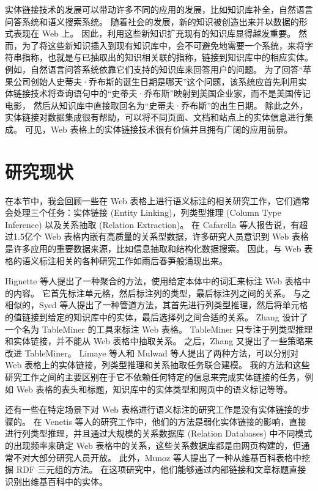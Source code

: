实体链接技术的发展可以带动许多不同的应用的发展，比如知识库补全，自然语言问答系统和语义搜索系统。
随着社会的发展，新的知识被创造出来并以数据的形式表现在 Web 上。
因此，利用这些新知识扩充现有的知识库显得越发重要。
然而，为了将这些新知识插入到现有知识库中，会不可避免地需要一个系统，来将字符串指称，也就是与已抽取出的知识相关联的指称，链接到知识库中的相应实体。
例如，自然语言问答系统依靠它们支持的知识库来回答用户的问题。
为了回答``苹果公司创始人史蒂夫·乔布斯的诞生日期是哪天''这个问题，该系统应首先利用实体链接技术将查询语句中的``史蒂夫·乔布斯''映射到美国企业家，而不是美国传记电影，
然后从知识库中直接取回名为``史蒂夫·乔布斯''的出生日期。
除此之外，实体链接对数据集成很有帮助，可以将不同页面、文档和站点上的实体信息进行集成。
可见，Web 表格上的实体链接技术很有价值并且拥有广阔的应用前景。\par


\section{研究现状}

在本节中，我会回顾一些在 Web 表格上进行语义标注的相关研究工作，它们通常会处理三个任务：实体链接 (Entity Linking)，列类型推理 (Column Type Inference) 以及关系抽取 (Relation Extraction)。 
在 Cafarella 等人\cite{cafarella2008webtables}报告说，有超过1.5亿个 Web 表格内嵌有高质量的关系型数据，许多研究人员意识到 Web 表格是许多应用的重要数据来源，比如信息抽取和结构化数据搜索。 
因此，与 Web 表格的语义标注相关的各种研究工作如雨后春笋般涌现出来。\par

Hignette 等人\cite{hignette2009fuzzy}提出了一种聚合的方法，使用给定本体中的词汇来标注 Web 表格中的内容。
它首先标注单元格，然后标注列的类型，最后标注列之间的关系。
与之相似的，Syed 等人\cite{syed2010exploiting}提出了一种管道方法，其首先进行列类型推理，然后将单元格的值链接到给定的知识库中的实体，最后选择列之间合适的关系。
Zhang \cite{zhang2014towards}设计了一个名为 TableMiner 的工具来标注 Web 表格。
TableMiner 只专注于列类型推理和实体链接，并不能从 Web 表格中抽取关系。
之后，Zhang \cite{zhang2014learning}又提出了一些策略来改进 TableMiner。 
Limaye 等人\cite{limaye2010annotating}和 Mulwad 等人\cite{mulwad2013semantic}提出了两种方法，可以分别对 Web 表格上的实体链接，列类型推理和关系抽取任务联合建模。
我的方法和这些研究工作之间的主要区别在于它不依赖任何特定的信息来完成实体链接的任务，例如 Web 表格的表头和标题，知识库中的实体类型和网页中的语义标记等等。\par

还有一些在特定场景下对 Web 表格进行语义标注的研究工作是没有实体链接的步骤的。
在 Venetis 等人\cite{venetis2011recovering}的研究工作中，他们的方法是弱化实体链接的影响，直接进行列类型推理，并且通过大规模的关系数据库 (Relation Databases) 中不同模式的出现频率来确定 Web 表格中的关系，这些关系数据库都是由网页构建的，但通常不对大部分研究人员开放。
此外，Munoz 等人\cite{munoz2014using}提出了一种从维基百科表格中挖掘 RDF 三元组的方法。
在这项研究中，他们能够通过内部链接和文章标题直接识别出维基百科中的实体。\par


